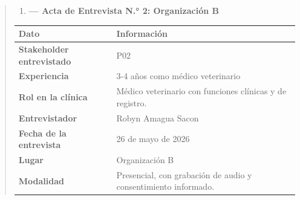 \documentclass[
]{article}
\newcounter{none} %
\begin{document}
\begin{quote}
\begin{enumerate}
\def\labelenumi{\arabic{enumi}.}
\setcounter{enumi}{1}
\item
  \textbf{--- Acta de Entrevista N.° 2: Organización B}
\end{enumerate}

{\def\LTcaptype{none} %
\begin{longtable}[]{|
  >{\raggedright\arraybackslash}p{}|
  >{\raggedright\arraybackslash}p{}|}
\hline
\begin{minipage}[b]{\linewidth}\centering
\textbf{Dato}
\end{minipage} & \begin{minipage}[b]{\linewidth}\centering
\textbf{Información}
\end{minipage} \\
\hline
\endhead
\hline
\endlastfoot
\textbf{Stakeholder} \textbf{entrevistado} & \begin{minipage}[t]{\linewidth}\raggedright
P02
\end{minipage} \\
\hline
\textbf{Experiencia} & \begin{minipage}[t]{\linewidth}\raggedright
3-4 años como médico veterinario
\end{minipage} \\
\hline
\textbf{Rol en la clínica} & \begin{minipage}[t]{\linewidth}\raggedright
Médico veterinario con funciones clínicas y de registro.
\end{minipage} \\
\hline
\textbf{Entrevistador} & \begin{minipage}[t]{\linewidth}\raggedright
Robyn Amagua Sacon
\end{minipage} \\
\hline
\textbf{Fecha de la} \textbf{entrevista} & \begin{minipage}[t]{\linewidth}\raggedright
26 de mayo de 2026
\end{minipage} \\
\hline
\textbf{Lugar} & \begin{minipage}[t]{\linewidth}\raggedright
Organización B
\end{minipage} \\
\hline
\textbf{Modalidad} & \begin{minipage}[t]{\linewidth}\raggedright
Presencial, con grabación de audio y consentimiento informado.

\end{minipage}
\end{longtable}}
\end{quote}
\end{document}
